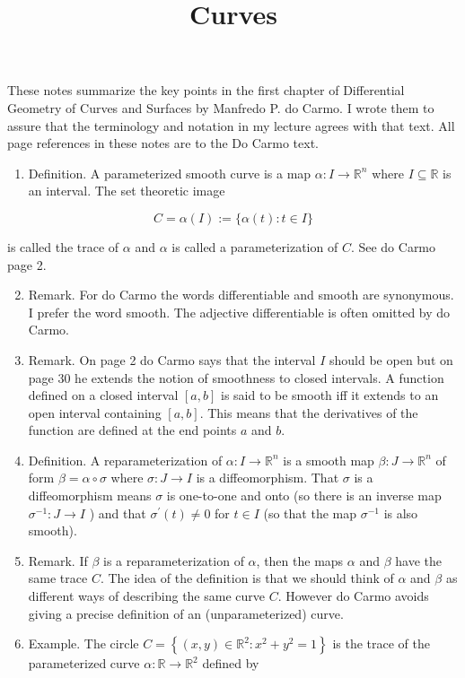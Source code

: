 \documentclass[10pt]{article}
\title{Curves }
\date{}
\begin{document}
\maketitle

These notes summarize the key points in the first chapter of Differential Geometry of Curves and Surfaces by Manfredo P. do Carmo. I wrote them to assure that the terminology and notation in my lecture agrees with that text. All page references in these notes are to the Do Carmo text.

\begin{enumerate}
  \item Definition. A parameterized smooth curve is a map $\alpha: I \rightarrow \mathbb{R}^{n}$ where $I \subseteq \mathbb{R}$ is an interval. The set theoretic image
\end{enumerate}

$$
C=\alpha(I):=\{\alpha(t): t \in I\}
$$

is called the trace of $\alpha$ and $\alpha$ is called a parameterization of $C$. See do Carmo page 2.

\begin{enumerate}
  \setcounter{enumi}{1}
  \item Remark. For do Carmo the words differentiable and smooth are synonymous. I prefer the word smooth. The adjective differentiable is often omitted by do Carmo.

  \item Remark. On page 2 do Carmo says that the interval $I$ should be open but on page 30 he extends the notion of smoothness to closed intervals. A function defined on a closed interval $[a, b]$ is said to be smooth iff it extends to an open interval containing $[a, b]$. This means that the derivatives of the function are defined at the end points $a$ and $b$.

  \item Definition. A reparameterization of $\alpha: I \rightarrow \mathbb{R}^{n}$ is a smooth map $\beta: J \rightarrow \mathbb{R}^{n}$ of form $\beta=\alpha \circ \sigma$ where $\sigma: J \rightarrow I$ is a diffeomorphism. That $\sigma$ is a diffeomorphism means $\sigma$ is one-to-one and onto (so there is an inverse map $\sigma^{-1}: J \rightarrow I$ ) and that $\sigma^{\prime}(t) \neq 0$ for $t \in I$ (so that the map $\sigma^{-1}$ is also smooth).

  \item Remark. If $\beta$ is a reparameterization of $\alpha$, then the maps $\alpha$ and $\beta$ have the same trace $C$. The idea of the definition is that we should think of $\alpha$ and $\beta$ as different ways of describing the same curve $C$. However do Carmo avoids giving a precise definition of an (unparameterized) curve.

  \item Example. The circle $C=\left\{(x, y) \in \mathbb{R}^{2}: x^{2}+y^{2}=1\right\}$ is the trace of the parameterized curve $\alpha: \mathbb{R} \rightarrow \mathbb{R}^{2}$ defined by

\end{enumerate}
\end{document}
